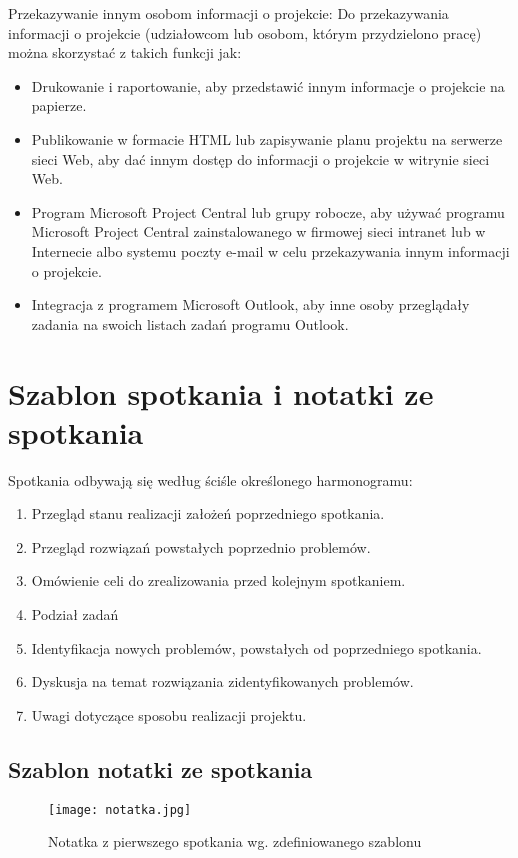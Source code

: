 
Przekazywanie innym osobom informacji o projekcie:
 Do przekazywania informacji o projekcie (udziałowcom lub osobom, którym przydzielono pracę) można skorzystać z takich funkcji jak:
\begin{itemize}
\item Drukowanie i raportowanie, aby przedstawić innym informacje o projekcie na papierze. 
\item Publikowanie w formacie HTML lub zapisywanie planu projektu na serwerze sieci Web, aby dać innym dostęp do informacji o projekcie w witrynie sieci Web. 
\item Program Microsoft Project Central lub grupy robocze, aby używać programu Microsoft Project Central zainstalowanego w firmowej sieci intranet lub w Internecie albo systemu poczty e-mail w celu przekazywania innym informacji o projekcie. 
\item Integracja z programem Microsoft Outlook, aby inne osoby przeglądały zadania na swoich listach zadań programu Outlook.
\end{itemize}



\section{Szablon spotkania i notatki ze spotkania}


Spotkania odbywają się według ściśle określonego harmonogramu:
\begin{enumerate}
	\item Przegląd stanu realizacji założeń poprzedniego spotkania.
	\item Przegląd rozwiązań powstałych poprzednio problemów.
	\item Omówienie celi do zrealizowania przed kolejnym spotkaniem.
	\item Podział zadań
	\item Identyfikacja nowych problemów, powstałych od poprzedniego spotkania.
	\item Dyskusja na temat rozwiązania zidentyfikowanych problemów.
	\item Uwagi dotyczące sposobu realizacji projektu.
\end{enumerate}

\clearpage

\subsection*{Szablon notatki ze spotkania}

\begin{figure}[!h]
\centering
\texttt{[image: notatka.jpg]}
\caption{Notatka z pierwszego spotkania wg. zdefiniowanego szablonu}
\label{fig:notatka}
\end{figure}
